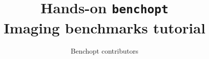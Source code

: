 \documentclass[unknownkeysallowed]{beamer}
\author{Benchopt contributors}
\title{
    Hands-on \texttt{benchopt}\\
    Imaging benchmarks tutorial
}
\begin{document}


    \begin{frame}
        \titlepage
    \end{frame}





%
%
%
\end{document}
